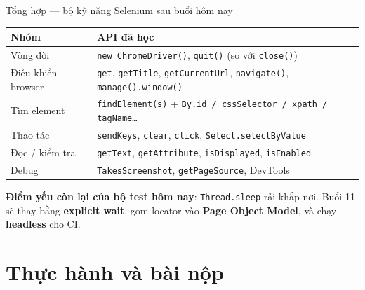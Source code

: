 \documentclass[aspectratio=169,12pt]{beamer}
\begin{document}
\begin{frame}{Tổng hợp --- bộ kỹ năng Selenium sau buổi hôm nay}
  \begin{center}
  \footnotesize
  \setlength{\tabcolsep}{4pt}
  \begin{tabular}{>{\raggedright\arraybackslash}p{3.3cm}>{\raggedright\arraybackslash}p{8.2cm}}
    \toprule
    \textbf{Nhóm} & \textbf{API đã học} \\
    \midrule
    Vòng đời & \texttt{new ChromeDriver()}, \texttt{quit()} (so với \texttt{close()}) \\
    Điều khiển browser & \texttt{get}, \texttt{getTitle}, \texttt{getCurrentUrl}, \texttt{navigate()}, \texttt{manage().window()} \\
    Tìm element & \texttt{findElement(s)} + \texttt{By.id / cssSelector / xpath / tagName\ldots} \\
    Thao tác & \texttt{sendKeys}, \texttt{clear}, \texttt{click}, \texttt{Select.selectByValue} \\
    Đọc / kiểm tra & \texttt{getText}, \texttt{getAttribute}, \texttt{isDisplayed}, \texttt{isEnabled} \\
    Debug & \texttt{TakesScreenshot}, \texttt{getPageSource}, DevTools \\
    \bottomrule
  \end{tabular}
  \end{center}

  {\small \textbf{Điểm yếu còn lại của bộ test hôm nay}: \texttt{Thread.sleep}
  rải khắp nơi. Buổi 11 sẽ thay bằng \textbf{explicit wait}, gom locator vào
  \textbf{Page Object Model}, và chạy \textbf{headless} cho CI.}
\end{frame}

\section{Thực hành và bài nộp}
\end{document}
